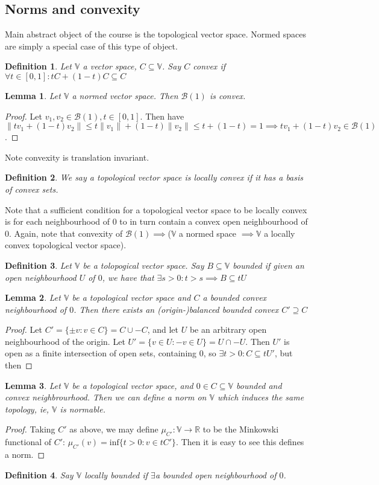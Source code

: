 \documentclass{article}
\newtheorem{lemma}{Lemma}[subsection]
\newtheorem{definition}{Definition}[subsection]
\begin{document}
\subsection{Norms and convexity}
Main abstract object of the course is the topological vector space.  Normed spaces are simply a special case of this type of object.
\begin{definition}
  Let $\mathbb V$ a vector space, $C\subseteq\mathbb V$.  Say $C$ convex if $\forall t\in[0,1]:tC+(1-t)C\subseteq C$
\end{definition}
\begin{lemma}
  Let $\mathbb V$ a normed vector space. Then $\mathcal B(1)$ is convex.
\end{lemma}
\begin{proof}
  Let $v_1,v_2\in\mathcal B(1),t\in[0,1]$.  Then have $\|tv_1+(1-t)v_2\|\leq t\|v_1\|+(1-t)\|v_2\|\leq t+(1-t)=1\implies tv_1+(1-t)v_2\in\mathcal B(1)$.
\end{proof}
Note convexity is translation invariant.
\begin{definition}
  We say a topological vector space is locally convex if it has a basis of convex sets.
\end{definition}
Note that a sufficient condition for a topological vector space to be locally convex is for each neighbourhood of $0$ to in turn contain a convex open neighbourhood of $0$.  Again, note that convexity of $\mathcal B(1)\implies$($\mathbb V$ a normed space $\implies\mathbb V$ a locally convex topological vector space).
\begin{definition}
  Let $\mathbb V$ be a tolopogical vector space.  Say $B\subseteq\mathbb V$ bounded if given an open neighbourhood $U$ of $0$, we have that $\exists s>0:t>s\implies B\subseteq tU$
\end{definition}
\begin{lemma}
  Let $\mathbb V$ be a topological vector space and $C$ a bounded convex neighbourhood of $0$.  Then there exists an (origin-)balanced bounded convex $C'\supseteq C$
\end{lemma}
\begin{proof}
  Let $C'=\{\pm v:v\in C\}=C\cup-C$, and let $U$ be an arbitrary open neighbourhood of the origin.  Let $U'=\{v\in U:-v\in U\}=U\cap-U$.  Then $U'$ is open as a finite intersection of open  sets, containing 0, so $\exists t>0:C\subseteq tU'$, but then
\end{proof}
\begin{lemma}
  Let $\mathbb V$ be a topological vector space, and $0\in C\subseteq\mathbb V$ bounded and convex neighbrourhood.  Then we can define a norm on $\mathbb V$ which induces the same topology, ie, $\mathbb V$ is normable.
\end{lemma}
\begin{proof}
  Taking $C'$ as above, we may define $\mu_{C'}:\mathbb V \rightarrow \mathbb R$ to be the Minkowski functional of $C'$: $\mu_{C'}(v)=\text{inf}\{t>0:v\in tC'\}$.  Then it is easy to see this defines a norm.
\end{proof}
\begin{definition}
  Say $\mathbb V$ locally bounded if $\exists$a bounded open neighbourhood of $0$.
\end{definition}
\end{document}
